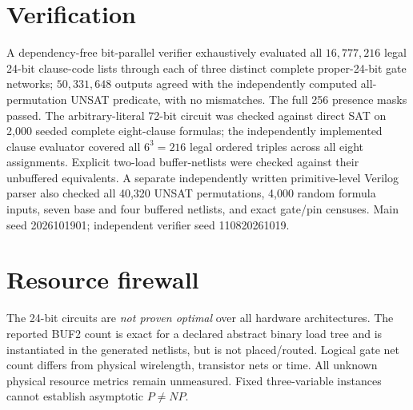 \documentclass[11pt]{article}
\begin{document}
\section*{Verification}
A dependency-free bit-parallel verifier exhaustively evaluated all $16{,}777{,}216$ legal 24-bit clause-code lists through each of three distinct complete proper-24-bit gate networks; $50{,}331{,}648$ outputs agreed with the independently computed all-permutation UNSAT predicate, with no mismatches. The full 256 presence masks passed. The arbitrary-literal 72-bit circuit was checked against direct SAT on 2,000 seeded complete eight-clause formulas; the independently implemented clause evaluator covered all $6^3=216$ legal ordered triples across all eight assignments. Explicit two-load buffer-netlists were checked against their unbuffered equivalents. A separate independently written primitive-level Verilog parser also checked all 40,320 UNSAT permutations, 4,000 random formula inputs, seven base and four buffered netlists, and exact gate/pin censuses. Main seed 2026101901; independent verifier seed 110820261019.

\section*{Resource firewall}
The 24-bit circuits are \emph{not proven optimal} over all hardware architectures. The reported BUF2 count is exact for a declared abstract binary load tree and is instantiated in the generated netlists, but is not placed/routed. Logical gate net count differs from physical wirelength, transistor nets or time. All unknown physical resource metrics remain unmeasured. Fixed three-variable instances cannot establish asymptotic $P\ne NP$.
\end{document}
